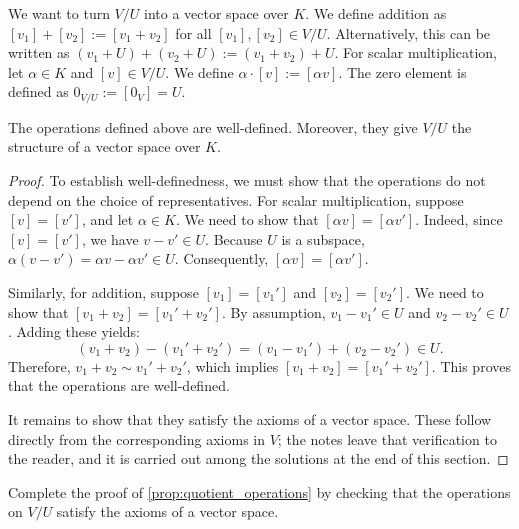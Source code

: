 We want to turn $V/U$ into a vector space over $K$. We define addition as $[v_1] + [v_2] := [v_1 + v_2]$ for all $[v_1], [v_2] \in V/U$. Alternatively, this can be written as $(v_1 + U) + (v_2 + U) := (v_1 + v_2) + U$. For scalar multiplication, let $\alpha \in K$ and $[v] \in V/U$. We define $\alpha \cdot [v] := [\alpha v]$. The zero element is defined as $0_{V/U} := [0_V] = U$.

\begin{proposition}
  \label{prop:quotient_operations}
  The operations defined above are well-defined. Moreover, they give $V/U$ the structure of a vector space over $K$.
\end{proposition}

\begin{proof}
  To establish well-definedness, we must show that the operations do not depend on the choice of representatives.
  For scalar multiplication, suppose $[v] = [v']$, and let $\alpha \in K$. We need to show that $[\alpha v] = [\alpha v']$. Indeed, since $[v] = [v']$, we have $v - v' \in U$. Because $U$ is a subspace, $\alpha(v - v') = \alpha v - \alpha v' \in U$. Consequently, $[\alpha v] = [\alpha v']$.

  Similarly, for addition, suppose $[v_1] = [v_1']$ and $[v_2] = [v_2']$. We need to show that $[v_1 + v_2] = [v_1' + v_2']$. By assumption, $v_1 - v_1' \in U$ and $v_2 - v_2' \in U$. Adding these yields:
  \[ (v_1 + v_2) - (v_1' + v_2') = (v_1 - v_1') + (v_2 - v_2') \in U. \]
  Therefore, $v_1 + v_2 \sim v_1' + v_2'$, which implies $[v_1 + v_2] = [v_1' + v_2']$. This proves that the operations are well-defined.

  It remains to show that they satisfy the axioms of a vector space. These follow directly from the corresponding axioms in $V$; the notes leave that verification to the reader, and it is carried out among the solutions at the end of this section.
\end{proof}

\begin{exercise}
  \label{exc:quotient_axioms}
  Complete the proof of \cref{prop:quotient_operations} by checking that the operations on $V/U$ satisfy the axioms of a vector space.
\end{exercise}


